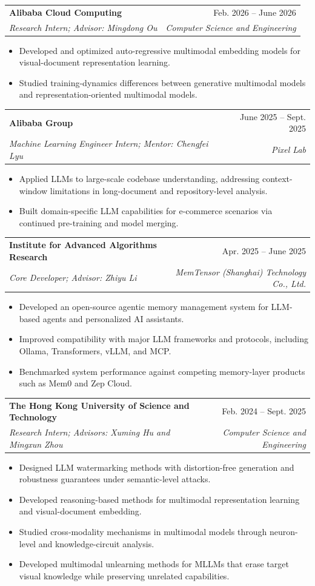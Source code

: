 \documentclass[letterpaper,10pt]{article}
\makeatletter
\newcommand{\resumeItem}[1]{
  \item\small{{#1 \vspace{-2pt}}}
}
\newcommand{\resumeSubheading}[4]{
  \vspace{-2pt}\item
    \begin{tabular*}{0.97\textwidth}[t]{l@{\extracolsep{\fill}}r}
      \textbf{#1} & #2 \\
      \textit{\small#3} & \textit{\small #4} \\
    \end{tabular*}\vspace{-7pt}
}
\newcommand{\resumeItemListStart}{\begin{itemize}[leftmargin=0.2in]}
\newcommand{\resumeItemListEnd}{\end{itemize}\vspace{-5pt}}
\makeatother
\begin{document}

    \resumeSubheading
      {Alibaba Cloud Computing}{Feb. 2026 -- June 2026}
      {Research Intern; Advisor: Mingdong Ou}{Computer Science and Engineering}
      \resumeItemListStart
        \resumeItem{Developed and optimized auto-regressive multimodal embedding models for visual-document representation learning.}
        \resumeItem{Studied training-dynamics differences between generative multimodal models and representation-oriented multimodal models.}
      \resumeItemListEnd

    \resumeSubheading
      {Alibaba Group}{June 2025 -- Sept. 2025}
      {Machine Learning Engineer Intern; Mentor: Chengfei Lyu}{Pixel Lab}
      \resumeItemListStart
        \resumeItem{Applied LLMs to large-scale codebase understanding, addressing context-window limitations in long-document and repository-level analysis.}
        \resumeItem{Built domain-specific LLM capabilities for e-commerce scenarios via continued pre-training and model merging.}
      \resumeItemListEnd

    \resumeSubheading
      {Institute for Advanced Algorithms Research}{Apr. 2025 -- June 2025}
      {Core Developer; Advisor: Zhiyu Li}{MemTensor (Shanghai) Technology Co., Ltd.}
      \resumeItemListStart
        \resumeItem{Developed an open-source agentic memory management system for LLM-based agents and personalized AI assistants.}
        \resumeItem{Improved compatibility with major LLM frameworks and protocols, including Ollama, Transformers, vLLM, and MCP.}
        \resumeItem{Benchmarked system performance against competing memory-layer products such as Mem0 and Zep Cloud.}
      \resumeItemListEnd

    \resumeSubheading
      {The Hong Kong University of Science and Technology}{Feb. 2024 -- Sept. 2025}
      {Research Intern; Advisors: Xuming Hu and Mingxun Zhou}{Computer Science and Engineering}
      \resumeItemListStart
        \resumeItem{Designed LLM watermarking methods with distortion-free generation and robustness guarantees under semantic-level attacks.}
        \resumeItem{Developed reasoning-based methods for multimodal representation learning and visual-document embedding.}
        \resumeItem{Studied cross-modality mechanisms in multimodal models through neuron-level and knowledge-circuit analysis.}
        \resumeItem{Developed multimodal unlearning methods for MLLMs that erase target visual knowledge while preserving unrelated capabilities.}
      \resumeItemListEnd
\end{document}
